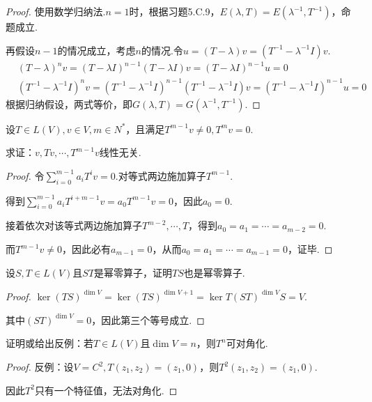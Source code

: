 \begin{proof}
    使用数学归纳法.\(n=1\)时，根据习题5.C.9，\(E(\lambda,T)=E(\lambda^{-1},T^{-1})\)，命题成立.%
    
    再假设\(n-1\)的情况成立，考虑\(n\)的情况.令\(u=(T-\lambda)v=(T^{-1}-\lambda^{-1} I)v\).
    \begin{align*}
        &(T-\lambda)^n v=(T-\lambda I)^{n-1}(T-\lambda I)v=(T-\lambda I)^{n-1}u=0 \\
        &(T^{-1}-\lambda^{-1} I)^n v=(T^{-1}-\lambda^{-1} I)^{n-1}(T^{-1}-\lambda^{-1} I)v
            =(T^{-1}-\lambda^{-1} I)^{n-1}u=0
    \end{align*}
    根据归纳假设，两式等价，即\(G(\lambda,T)=G(\lambda^{-1},T^{-1})\).
\end{proof}

\begin{problem}[5]\label{8.A.5}
    设\(T \in L(V),v \in V,m \in N^*\)，且满足\(T^{m-1}v \ne 0,T^m v=0\).
    
    求证：\(v,Tv,\cdots,T^{m-1}v\)线性无关.
\end{problem}

\begin{proof}
    令\(\sum_{i=0}^{m-1} a_iT^i v=0\).对等式两边施加算子\(T^{m-1}\).

    得到\(\sum_{i=0}^{m-1} a_iT^{i+m-1} v=a_0T^{m-1} v=0\)，因此\(a_0=0\).
    
    接着依次对该等式两边施加算子\(T^{m-2},\cdots,T\)，得到\(a_0=a_1=\cdots=a_{m-2}=0\).
    
    而\(T^{m-1}v \ne 0\)，因此必有\(a_{m-1}=0\)，从而\(a_0=a_1=\cdots=a_{m-1}=0\)，证毕.
\end{proof}

\begin{problem}[9]\label{8.A.9}
    设\(S,T \in L(V)\)且\(ST\)是幂零算子，证明\(TS\)也是幂零算子.
\end{problem}

\begin{proof}
    \(\ker (TS)^{\dim V}=\ker (TS)^{\dim V+1}=\ker T(ST)^{\dim V}S=V\).

    其中\((ST)^{\dim V}=0\)，因此第三个等号成立.
\end{proof}

\begin{problem}[11]\label{8.A.11}
    证明或给出反例：若\(T \in L(V)\)且\(\dim V=n\)，则\(T^n\)可对角化.
\end{problem}

\begin{proof}
    反例：设\(V=C^2,T(z_1,z_2)=(z_1,0)\)，则\(T^2(z_1,z_2)=(z_1,0)\).

    因此\(T^2\)只有一个特征值，无法对角化.
\end{proof}

